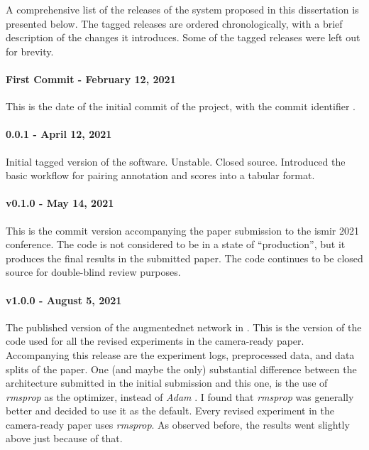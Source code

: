 
A comprehensive list of the releases of the system proposed
in this dissertation is presented below. The tagged releases
are ordered chronologically, with a brief description of the
changes it introduces. Some of the tagged releases were left
out for brevity.

\paragraph{First Commit - February 12, 2021}
This is the date of the initial commit of the project, with
the commit identifier .

\paragraph{0.0.1 - April 12, 2021}
Initial tagged version of the software. Unstable. Closed
source. Introduced the basic workflow for pairing annotation
and scores into a tabular format.

\paragraph{v0.1.0 - May 14, 2021}
This is the commit version accompanying the paper submission
to the \gls{ismir} 2021 conference. The code is not
considered to be in a state of ``production'', but it
produces the final results in the submitted paper. The code
continues to be closed source for double-blind review
purposes.

\paragraph{v1.0.0 - August 5, 2021}
The published version of the \gls{augmentednet} network in
\textcite{napoleslopez2021augmentednet}. This is the version
of the code used for all the revised experiments in the
camera-ready paper. Accompanying this release are the
experiment logs, preprocessed data, and data splits of the
paper. One (and maybe the only) substantial difference
between the architecture submitted in the initial submission
and this one, is the use of \emph{rmsprop} as the optimizer,
instead of \emph{Adam} \parencite{kingma2014adam}. I found
that \emph{rmsprop} was generally better and decided to use
it as the default. Every revised experiment in the
camera-ready paper uses \emph{rmsprop}. As observed before,
the results went slightly above just because of that.

